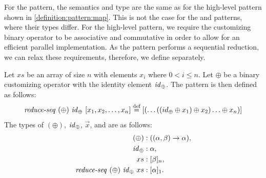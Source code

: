 For the \mapSeq pattern, the semantics and type are the same as for the high-level \map pattern shown in \autoref{definition:pattern:map}.
This is not the case for the \reduceSeq and \reduce patterns, where their types differ.
For the high-level \reduce pattern, we require the customizing binary operator to be associative and commutative in order to allow for an efficient parallel implementation.
As the \reduceSeq pattern performs a sequential reduction, we can relax these requirements, therefore, we define \reduceSeq separately.
\begin{definition}
  \label{definition:pattern:reduceSeq}
  Let $xs$ be an array of size $n$ with elements $x_i$ where $0 < i \leq n$.
  Let $\oplus$ be a binary customizing operator with the identity element $\text{\textit{id}}_\oplus$.
  The \reduceSeq pattern is then defined as follows:
  \begin{equation*}
    \reduceSeq\ (\oplus)\ \id_\oplus\ [x_1, x_2, \dots, x_n]
      \eqdef [(\dots((id_\oplus \oplus x_1) \oplus x_2) \ldots \oplus x_n)]
  \end{equation*}
  The types of $(\oplus)$, $\text{\textit{id}}_\oplus$, $\vec{x}$, and \reduce are as follows:
  \begin{align*}
    (\oplus) &: ((\alpha, \beta) \rightarrow \alpha),\\
    \text{\textit{id}}_\oplus &: \alpha,\\
    xs &: [\beta]_n,\\
    \text{\textit{reduce-seq}}\ (\oplus)\ \text{\textit{id}}_\oplus\ xs &: [\alpha]_1 .
  \end{align*}
\end{definition}


